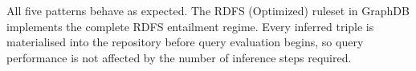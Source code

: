 \documentclass[11pt,a4paper]{article}
\begin{document}
\noindent All five patterns behave as expected.  The RDFS (Optimized) ruleset
in GraphDB implements the complete RDFS entailment regime.  Every inferred triple
is materialised into the repository before query evaluation begins, so query
performance is not affected by the number of inference steps required.
\end{document}
